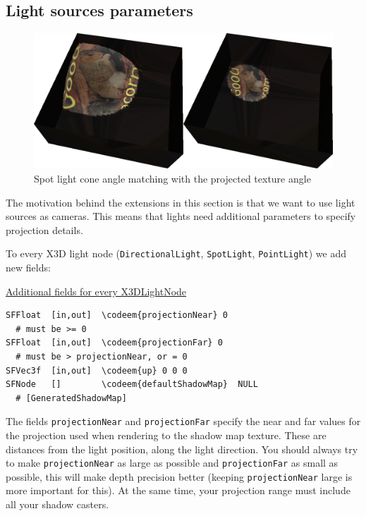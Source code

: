 \documentclass{acmsiggraph}                     %
\newenvironment{mycode}
{\begin{mycodecore}}
{\end{mycodecore}
\vspace{-0.1in}}
\newcommand*{\codeem}[1]{\textbf{#1}}
\begin{document}
\subsection{Light sources parameters}
\label{sec_light_params}

\begin{figure}[t]
  \centering
  \includegraphics[width=7in]{tex_projected_spot}
  \caption{Spot light cone angle matching with the projected texture angle}
  \label{fig_tex_projected_spot}
\end{figure}

The motivation behind the extensions in this section is that we want to use
light sources as cameras. This means that lights need additional parameters
to specify projection details.

\needspace{0.5in}
To every X3D light node (\texttt{DirectionalLight}, \texttt{SpotLight},
\texttt{PointLight}) we add new fields:

\begin{mycode}
\underline{Additional fields for every X3DLightNode}
\begin{Verbatim}[commandchars=\\\{\}]
SFFloat  [in,out]  \codeem{projectionNear} 0
  # must be >= 0
SFFloat  [in,out]  \codeem{projectionFar} 0
  # must be > projectionNear, or = 0
SFVec3f  [in,out]  \codeem{up} 0 0 0
SFNode   []        \codeem{defaultShadowMap}  NULL
  # [GeneratedShadowMap]
\end{Verbatim}
\end{mycode}

The fields \texttt{projectionNear} and \texttt{projectionFar} specify the near
and far values for the projection used when rendering to the shadow map texture.
These are distances from the light position, along the light direction.
You should always try to make \texttt{projectionNear} as large as possible
and \texttt{projectionFar} as small as possible,
this will make depth precision better (keeping \texttt{projectionNear} large
is more important for this). At the same time, your projection range
must include all your shadow casters.
\end{document}
